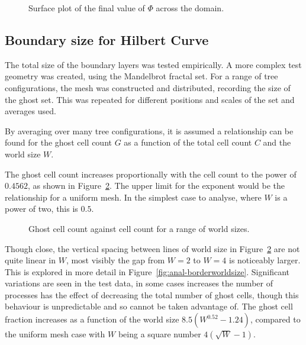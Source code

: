 \documentclass[twoside]{IIBproject}
\numberwithin{figure}{section}
\begin{document}
        \begin{figure}[!htbp]
            \centering
            
            \caption{Surface plot of the final value of $\Phi$ across the domain.}
            \label{fig:pois-result}
        \end{figure}



    \subsection{Boundary size for Hilbert Curve}
        \label{sec:results-boundarysize}

        The total size of the boundary layers was tested empirically. A more complex test geometry was created, using the Mandelbrot fractal set. For a range of tree configurations, the mesh was constructed and distributed, recording the size of the ghost set. This was repeated for different positions and scales of the set and averages used.

        By averaging over many tree configurations, it is assumed a relationship can be found for the ghost cell count $G$ as a function of the total cell count $C$ and the world size $W$.

        The ghost cell count increases proportionally with the cell count to the power of $0.4562$, as shown in Figure~\ref{fig:anal-scaling}. The upper limit for the exponent would be the relationship for a uniform mesh. In the simplest case to analyse, where $W$ is a power of two, this is $0.5$. 

        \tikzset{external/export next=false}
        \begin{figure}[!htbp]
            \centering
            
            \caption{Ghost cell count against cell count for a range of world sizes. }
            \label{fig:anal-scaling}
        \end{figure}

        Though close, the vertical spacing between lines of world size in Figure~\ref{fig:anal-scaling} are not quite linear in $W$, most visibly the gap from $W=2$ to $W=4$ is noticeably larger. This is explored in more detail in Figure~\ref{fig:anal-borderworldsize}. Significant variations are seen in the test data, in some cases increases the number of processes has the effect of decreasing the total number of ghost cells, though this behaviour is unpredictable and so cannot be taken advantage of. The ghost cell fraction increases as a function of the world size $8.5(W^{0.52}-1.24)$, compared to the uniform mesh case with $W$ being a square number $4(\sqrt{W} - 1)$. 
\end{document}
